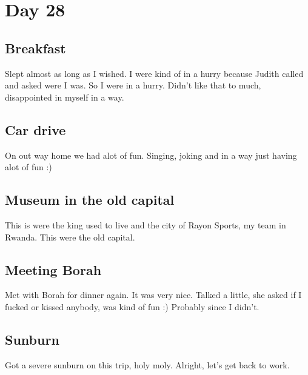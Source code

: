 \section{Day 28}
\subsection{Breakfast}
Slept almost as long as I wished. 
I were kind of in a hurry because Judith called and asked were I was.
So I were in a hurry.
Didn't like that to much, disappointed in myself in a way.
\subsection{Car drive}
On out way home we had alot of fun.
Singing, joking and in a way just having alot of fun :)
\subsection{Museum in the old capital}
This is were the king used to live and the city of Rayon Sports, my team in Rwanda.
This were the old capital. 
\subsection{Meeting Borah}
Met with Borah for dinner again.
It was very nice. Talked a little, she asked if I fucked or kissed anybody, was kind of fun :)
Probably since I didn't.
\subsection{Sunburn}
Got a severe sunburn on this trip, holy moly. 
Alright, let's get back to work.
